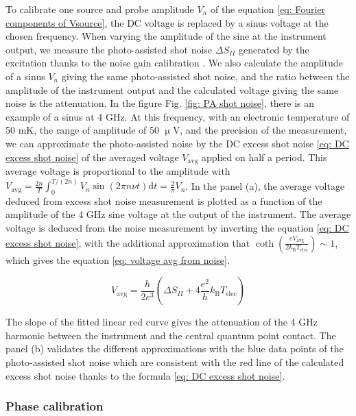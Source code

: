 To calibrate one source and probe amplitude $V_{n}$ of the equation \eqref{eq: Fourier components of Vsource}, the DC voltage is replaced by a sinus voltage at the chosen frequency.
When varying the amplitude of the sine at the instrument output, we measure the photo-assisted shot noise $\Delta S_{II}$ generated by the excitation thanks to the noise gain calibration \cite{bize2003bruit}.
We also calculate the amplitude of a sinus $V_{n}$ giving the same photo-assisted shot noise, and the ratio between the amplitude of the instrument output and the calculated voltage giving the same noise is the attenuation.
In the figure Fig. \ref{fig: PA shot noise}, there is an example of a sinus at 4 GHz.
At this frequency, with an electronic temperature of 50 mK, the range of amplitude of 50 $\upmu$V, and the precision of the measurement, we can approximate the photo-assisted noise by the DC excess shot noise \eqref{eq: DC excess shot noise} of the averaged voltage $V_{\mathrm{avg}}$ applied on half a period.
This average voltage is proportional to the amplitude with $V_{\mathrm{avg}} = \frac{2n}{T}\int_{0}^{T/(2n)}V_{n}\sin\left(2\pi n\nu t\right)\mathrm{d}t = \frac{2}{\pi}V_{n}$.
In the panel (a), the average voltage deduced from excess shot noise measurement is plotted as a function of the amplitude of the 4 GHz sine voltage at the output of the instrument.
The average voltage is deduced from the noise measurement by inverting the equation \eqref{eq: DC excess shot noise}, with the additional approximation that $\coth\left(\frac{eV_{\mathrm{avg}}}{2k_{\mathrm{B}}T_{\mathrm{elec}}}\right) \sim 1$, which gives the equation \eqref{eq: voltage avg from noise}.

\begin{equation}
V_{\mathrm{avg}} = \frac{h}{2e^{3}}\left(\Delta S_{II}+4\frac{e^{2}}{h}k_{\mathrm{B}}T_{\mathrm{elec}}\right) \label{eq: voltage avg from noise}
\end{equation}

The slope of the fitted linear red curve gives the attenuation of the 4 GHz harmonic between the instrument and the central quantum point contact.
The panel (b) validates the different approximations with the blue data points of the photo-assisted shot noise which are consistent with the red line of the calculated excess shot noise thanks to the formula \eqref{eq: DC excess shot noise}.

\subsubsection*{Phase calibration}

